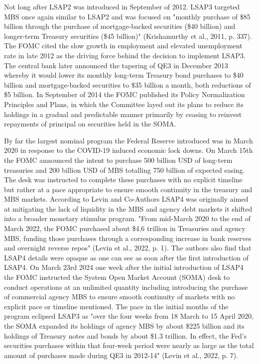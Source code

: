 Not long after LSAP2 was introduced in September of 2012. LSAP3 targeted MBS once again similar to LSAP2 and was focused on "monthly purchase of \$85 billion through the purchase of mortgage-backed securities (\$40 billion) and longer-term Treasury securities (\$45 billion)" (Krishamurthy et al., 2011, p. 337). The FOMC cited the slow growth in employment and elevated unemployment rate in late 2012 as the driving force behind the decision to implement LSAP3. The central bank later announced the tapering of QE3 in December 2013 whereby it would lower its monthly long-term Treasury bond purchases to \$40 billion and mortgage-backed securities to \$35 billion a month, both reductions of \$5 billion. In September of 2014 the FOMC published its Policy Normalization Principles and Plans, in which the Committee layed out its plans to reduce its holdings in a gradual and predictable manner primarily by ceasing to reinvest repayments of principal on securities held in the SOMA. 

By far the largest nominal program the Federal Reserve introduced was in March 2020 in response to the COVID-19 induced economic lock downs. On March 15th the FOMC announced the intent to purchase  500 billion USD of long-term treasuries and 200 billion USD of MBS totalling 750 billion of expected easing. The desk was instructed to complete these purchases with no explicit timeline but rather at a pace appropriate to ensure smooth continuity in the treasury and MBS markets. According to Levin and Co-Authors LSAP4 was originally aimed at mitigating the lack of liquidity in the MBS and agency debt markets it shifted into a broader monetary stimulus program. "From mid-March 2020 to the end of March 2022, the FOMC purchased about \$4.6 trillion in Treasuries and agency MBS, funding those purchases through a corresponding increase in bank reserves and overnight reverse repos" (Levin et al., 2022, p. 1). The authors also find that LSAP4 details were opaque as one can see as soon after the first introduction of LSAP4. On March 23rd 2024 one week after the initial introduction of LSAP4 the FOMC instructed the System Open Market Account (SOMA) desk to conduct operations at an unlimited quantity including introducing the purchase of commercial agency MBS to ensure smooth continuity of markets with no explicit pace or timeline mentioned. The pace in the initial months of the program eclipsed LSAP3 as "over the four weeks from 18 March to 15 April 2020, the SOMA expanded its holdings of agency MBS by about \$225 billion and its holdings of Treasury notes and bonds by about \$1.3 trillion. In effect, the Fed’s securities purchases within that four-week period were nearly as large as the total amount of purchases made during QE3 in 2012-14" (Levin et al., 2022, p. 7).

